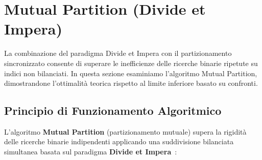 \FloatBarrier
\section{Mutual Partition (Divide et Impera)}
\label{sec:mutual-partition}

La combinazione del paradigma Divide et Impera con il partizionamento sincronizzato consente di superare le inefficienze delle ricerche binarie ripetute su indici non bilanciati. In questa sezione esaminiamo l'algoritmo Mutual Partition, dimostrandone l'ottimalit\`a teorica rispetto al limite inferiore basato su confronti.

\FloatBarrier
\subsection{Principio di Funzionamento Algoritmico}
L'algoritmo \textbf{Mutual Partition} (partizionamento mutuale) supera la rigidità delle ricerche binarie indipendenti applicando una suddivisione bilanciata simultanea basata sul paradigma \textbf{Divide et Impera}~\cite{baezayates2004}:

